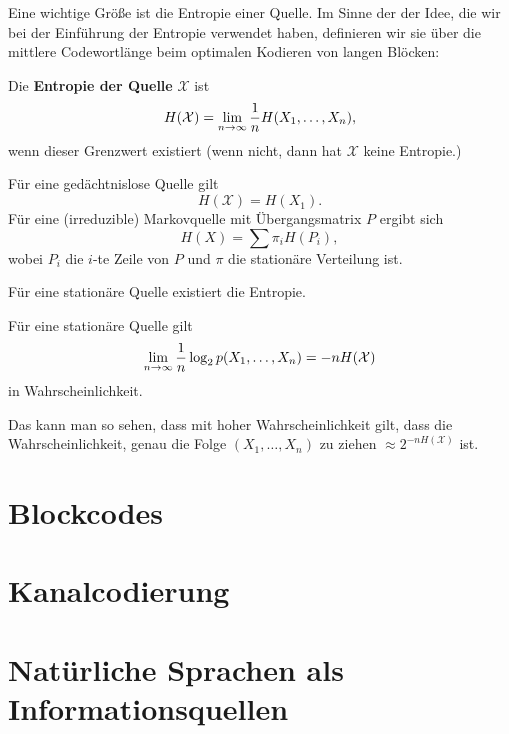 Eine wichtige Größe ist die Entropie einer Quelle. Im Sinne der 
der Idee, die wir bei der Einführung der Entropie verwendet haben, 
definieren wir sie über die mittlere Codewortlänge beim optimalen
Kodieren von langen Blöcken:

\begin{definition} Die \textbf{Entropie der Quelle} $\mathcal X$ ist 
\[H(\mathcal X)=\lim_{n\to\infty}{1\over n}H(X_1,\dots,X_n),\]
wenn dieser Grenzwert existiert (wenn nicht, dann hat $\mathcal X$
keine Entropie.)
\end{definition}

Für eine gedächtnislose Quelle gilt
\[H(\mathcal X)=H(X_1).\]
Für eine (irreduzible) Markovquelle mit Übergangsmatrix $P$ ergibt sich
\[H(X)=\sum\pi_iH(P_i),\]
wobei $P_i$ die $i$-te Zeile von $P$ und $\pi$ die stationäre Verteilung ist.

Für eine stationäre  Quelle existiert die Entropie.

\begin{satz} Für eine stationäre Quelle gilt
\[\lim_{n\to\infty}{1\over n}\log_2 p(X_1,\dots,X_n)=-nH(\mathcal X)\]
in Wahrscheinlichkeit.
\end{satz}
Das kann man so sehen, dass mit hoher Wahrscheinlichkeit gilt, dass die 
Wahrscheinlichkeit, genau die Folge $(X_1,\dots,X_n)$ zu ziehen
$\approx 2^{-nH(\mathcal X)}$ ist.

\section{Blockcodes}
\section{Kanalcodierung}
\section{Natürliche Sprachen als Informationsquellen}
